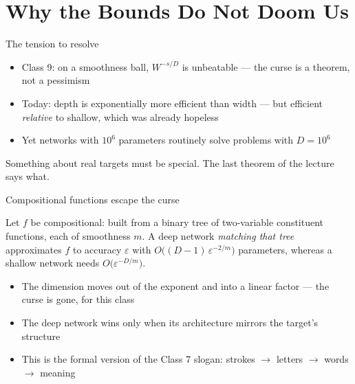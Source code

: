 \documentclass[aspectratio=169, 11pt]{beamer}
\begin{document}
\section{Why the Bounds Do Not Doom Us}

\begin{frame}{The tension to resolve}
  \vspace{0.3em}
  \begin{itemize}\setlength{\itemsep}{5pt}
    \item Class 9: on a smoothness ball, $W^{-s/D}$ is
          \alert{unbeatable} --- the curse is a theorem, not a
          pessimism
    \item Today: depth is exponentially more efficient than width ---
          but efficient \emph{relative} to shallow, which was already
          hopeless
    \item Yet networks with $10^{6}$ parameters routinely solve
          problems with $D=10^{6}$
  \end{itemize}
  \vspace{0.5em}
  \begin{redhighlight}
    Something about \alert{real targets} must be special. The last
    theorem of the lecture says what.
  \end{redhighlight}
\end{frame}

\begin{frame}{Compositional functions escape the curse}
  \vspace{0.2em}
  \begin{theorem}
    {\small Let $f$ be \alert{compositional}: built from a binary tree
    of two-variable constituent functions, each of smoothness $m$. A
    deep network \emph{matching that tree} approximates $f$ to accuracy
    $\varepsilon$ with
    $O\big((D-1)\,\varepsilon^{-2/m}\big)$ parameters, whereas a
    shallow network needs $O\big(\varepsilon^{-D/m}\big)$.}
  \end{theorem}
  \vspace{0.4em}
  {\small
  \begin{itemize}\setlength{\itemsep}{3pt}
    \item The dimension moves out of the \alert{exponent} and into a
          \alert{linear factor} --- the curse is gone, for this class
    \item The deep network wins only when its \alert{architecture
          mirrors the target's structure}
    \item This is the formal version of the Class 7 slogan: strokes
          $\to$ letters $\to$ words $\to$ meaning
  \end{itemize}}
\end{frame}
\end{document}
